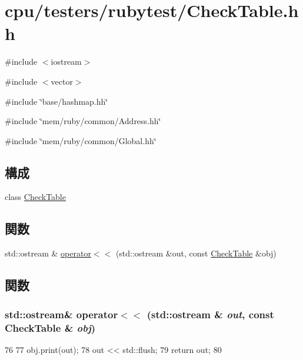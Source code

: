 \hypertarget{CheckTable_8hh}{
\section{cpu/testers/rubytest/CheckTable.hh}
\label{CheckTable_8hh}
}
{\ttfamily \#include $<$iostream$>$}\par
{\ttfamily \#include $<$vector$>$}\par
{\ttfamily \#include \char`\"{}base/hashmap.hh\char`\"{}}\par
{\ttfamily \#include \char`\"{}mem/ruby/common/Address.hh\char`\"{}}\par
{\ttfamily \#include \char`\"{}mem/ruby/common/Global.hh\char`\"{}}\par
\subsection*{構成}
\begin{DoxyCompactItemize}
\item 
class \hyperlink{classCheckTable}{CheckTable}
\end{DoxyCompactItemize}
\subsection*{関数}
\begin{DoxyCompactItemize}
\item 
std::ostream \& \hyperlink{CheckTable_8hh_a079c0e682d3540c27b0e434c0715dcde}{operator$<$$<$} (std::ostream \&out, const \hyperlink{classCheckTable}{CheckTable} \&obj)
\end{DoxyCompactItemize}


\subsection{関数}
\hypertarget{CheckTable_8hh_a079c0e682d3540c27b0e434c0715dcde}{
\subsubsection[{operator$<$$<$}]{\setlength{\rightskip}{0pt plus 5cm}std::ostream\& operator$<$$<$ (std::ostream \& {\em out}, \/  const {\bf CheckTable} \& {\em obj})}}
\label{CheckTable_8hh_a079c0e682d3540c27b0e434c0715dcde}



\begin{DoxyCode}
76 {
77     obj.print(out);
78     out << std::flush;
79     return out;
80 }
\end{DoxyCode}
